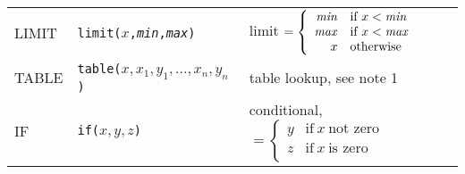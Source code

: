 \begin{table}
\begin{center}
\begin{tabular}{|l|l|l|}
LIMIT		& {\tt limit($x$,{\it min},{\it max})} & limit
					$= \left\{ \begin{array}{rl}
                                        {\it min} & \mbox{if}~ x < {\it min} \\
                                        {\it max} & \mbox{if}~ x < {\it max} \\
                                            x & \mbox{otherwise} \\
				       	\end{array}  \right. $ \\ %
TABLE		& {\tt table($x,x_1,y_1,...,x_n,y_n$)} & table lookup, 
					  see note 1 \\
IF		& {\tt if($x,y,z$)}     & conditional,
					$= \left\{ \begin{array}{rl}
                                        y & \mbox{if}~ x~ \mbox{not zero} \\
                                        z & \mbox{if}~ x~ \mbox{is zero} \\
				       	\end{array} \right. $ \\ %
\hline
\end{tabular}
\end{center}
\end{table}

